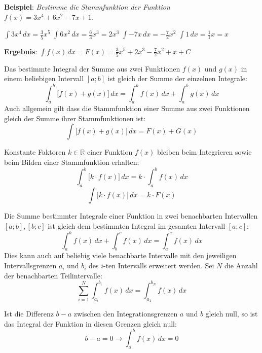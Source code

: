\textbf{Beispiel}: \emph{Bestimme die Stammfunktion der Funktion $f(x) = 3x^4 + 6x^2 -7x + 1$.}

\begin{center}
	$\int 3x^4 \, dx = \frac{3}{5}x^5$ \hspace{1cm} $\int 6x^2 \, dx = \frac{6}{3}x^3 = 2x^3$ \hspace{1cm} $\int -7x \, dx = -\frac{7}{2}x^2$ \hspace{1cm} $\int 1 \, dx = \frac{1}{1}x = x$
\end{center}

\textbf{Ergebnis}: $\int f(x) \, dx = F(x) = \frac{3}{5}x^5 + 2x^3 -\frac{7}{2}x^2 + x + C$

\begin{itemize}

	Das bestimmte Integral der Summe aus zwei Funktionen $f(x)$ und $g(x)$ in einem beliebigen Intervall $[a ; b]$ ist gleich der Summe der einzelnen Integrale: $$\int_a^b \big[f(x) + g(x)\big] \,dx = \int_a^b f(x) \, dx + \int_a^b g(x) \, dx$$ Auch allgemein gilt dass die Stammfunktion einer Summe aus zwei Funktionen gleich der Summe ihrer Stammfunktionen ist: $$\int \big[f(x) + g(x)\big]\,dx = F(x) + G(x)$$


	Konstante Faktoren $k \in \mathbb{R}$ einer Funktion $f(x)$ bleiben beim Integrieren sowie beim Bilden einer Stammfunktion erhalten: $$\int_a^b \big[k \cdot f(x)\big] \, dx = k \cdot \int_a^b f(x) \, dx$$ $$\int \big[k \cdot f(x)\big] \, dx = k \cdot F(x)$$


	Die Summe bestimmter Integrale einer Funktion in zwei benachbarten Intervallen $[a ; b], [b ; c]$ ist gleich dem bestimmten Integral im gesamten Intervall $[a ; c]$: $$\int_a^b f(x) \, dx + \int_b^c f(x) \, dx = \int_a^c f(x)\, dx$$ Dies kann auch auf beliebig viele benachbarte Intervalle mit den jeweiligen Intervallsgrenzen $a_i$ und $b_i$ des $i$-ten Intervalls erweitert werden. Sei $N$ die Anzahl der benachbarten Teilintervalle: $$\sum_{i=1}^{N} \int_{a_i}^{b_i} f(x) \, dx = \int_{a_1}^{b_N} f(x) \, dx$$


	Ist die Differenz $b - a$ zwischen den Integrationsgrenzen $a$ und $b$ gleich null, so ist das Integral der Funktion in diesen Grenzen gleich null: $$b - a = 0 \rightarrow \int_{a}^{b} f(x) \, dx = 0$$


\end{itemize}
